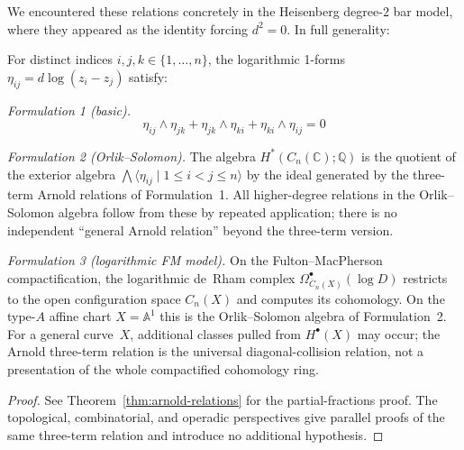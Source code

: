 \begin{theorem}\label{thm:arnold-three}
We encountered these relations concretely in the Heisenberg degree-$2$
bar model, where they appeared as the identity forcing $d^2 = 0$.
In full generality:

For distinct indices $i, j, k \in \{1, \ldots, n\}$, the logarithmic 1-forms $\eta_{ij} = d\log(z_i - z_j)$ satisfy:

\emph{Formulation 1 (basic).}
\[\eta_{ij} \wedge \eta_{jk} + \eta_{jk} \wedge \eta_{ki} + \eta_{ki} \wedge \eta_{ij} = 0\]

\emph{Formulation 2 (Orlik--Solomon).}
The algebra $H^*(C_n(\mathbb{C}); \mathbb{Q})$ is the quotient of the exterior algebra $\bigwedge\langle \eta_{ij} \mid 1 \le i < j \le n \rangle$ by the ideal generated by the three-term Arnold relations of Formulation~1. All higher-degree relations in the Orlik--Solomon algebra follow from these by repeated application; there is no independent ``general Arnold relation'' beyond the three-term version.

\emph{Formulation 3 (logarithmic FM model).}
On the Fulton--MacPherson compactification, the logarithmic de~Rham
complex $\Omega^\bullet_{\overline{C}_n(X)}(\log D)$ restricts to the
open configuration space $C_n(X)$ and computes its cohomology. On
the type-$A$ affine chart $X=\mathbb{A}^1$ this is the
Orlik--Solomon algebra of Formulation~2. For a general curve~$X$,
additional classes pulled from $H^\bullet(X)$ may occur; the Arnold
three-term relation is the universal diagonal-collision relation,
not a presentation of the whole compactified cohomology ring.
\end{theorem}

\begin{proof}
See Theorem~\ref{thm:arnold-relations} for the partial-fractions proof.
The topological, combinatorial, and operadic perspectives give
parallel proofs of the same three-term relation and introduce no
additional hypothesis.
\end{proof}

